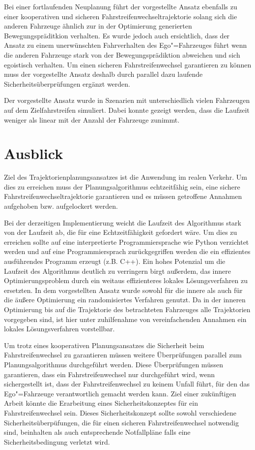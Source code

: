 Bei einer fortlaufenden Neuplanung f\"uhrt der vorgestellte Ansatz ebenfalls zu einer kooperativen und sicheren Fahrstreifenwechseltrajektorie solang sich die anderen Fahrzeuge \"ahnlich zur in der Optimierung generierten Bewegungspr\"aditkion verhalten.
Es wurde jedoch auch ersichtlich, dass der Ansatz zu einem unerw\"unschten Fahrverhalten des Ego"=Fahrzeuges f\"uhrt wenn die anderen Fahrzeuge stark von der Bewegungspr\"adiktion abweichen und sich egoistisch verhalten.
Um einen sicheren Fahrstreifenwechsel garantieren zu k\"onnen muss der vorgestellte Ansatz deshalb durch parallel dazu laufende Sicherheits\"uberpr\"ufungen erg\"anzt werden.

Der vorgestellte Ansatz wurde in Szenarien mit unterschiedlich vielen Fahrzeugen auf dem Zielfahrstreifen simuliert.
Dabei konnte gezeigt werden, dass die Laufzeit weniger als linear mit der Anzahl der Fahrzeuge zunimmt.



\section{Ausblick}
Ziel des Trajektorienplanungsansatzes ist die Anwendung im realen Verkehr.
Um dies zu erreichen muss der Planungsalgorithmus echtzeitf\"ahig sein, eine sichere Fahrstreifenwechseltrajektorie garantieren und es m\"ussen getroffene Annahmen aufgehoben bzw. aufgelockert werden.

Bei der derzeitigen Implementierung weicht die Laufzeit des Algorithmus stark von der Laufzeit ab, die f\"ur eine Echtzeitf\"ahigkeit gefordert w\"are.
Um dies zu erreichen sollte auf eine interpretierte Programmiersprache wie Python verzichtet werden und auf eine Programmiersprach zur\"uckgegriffen werden die ein effizientes ausf\"uhrendes Programm erzeugt (z.B. C++).
Ein hohes Potenzial um die Laufzeit des Algorithmus deutlich zu verringern birgt au{\ss}erdem, das innere Optimierungsproblem durch ein weitaus effizienteres lokales L\"osungsverfahren zu ersetzten.
In dem vorgestellten Ansatz wurde sowohl f\"ur die innere als auch f\"ur die \"au{\ss}ere Optimierung ein randomisiertes Verfahren genutzt.
Da in der inneren Optimierung bis auf die Trajektorie des betrachteten Fahrzeuges alle Trajektorien vorgegeben sind, ist hier unter zuhilfenahme von vereinfachenden Annahmen ein lokales L\"osungsverfahren vorstellbar.

Um trotz eines kooperativen Planungsansatzes die Sicherheit beim Fahrstreifenwechsel zu garantieren m\"ussen weitere \"Uberpr\"ufungen parallel zum Planungsalgorithmus durchgef\"uhrt werden.
Diese \"Uberpr\"ufungen m\"ussen garantieren, dass ein Fahrstreifenwechsel nur durchgef\"uhrt wird, wenn sichergestellt ist, dass der Fahrstreifenwechsel zu keinem Unfall f\"uhrt, f\"ur den das Ego"=Fahrzeuge verantwortlich gemacht werden kann.
Ziel einer zuk\"unftigen Arbeit k\"onnte die Erarbeitung eines Sicherheitskonzeptes f\"ur ein Fahrstreifenwechsel sein.
Dieses Sicherheitskonzept sollte sowohl verschiedene Sicherheits\"uberp\"ufungen, die f\"ur einen sicheren Fahrstreifenwechsel notwendig sind, beinhalten als auch entsprechende Notfallpl\"ane falls eine Sicherheitsbedingung verletzt wird.

